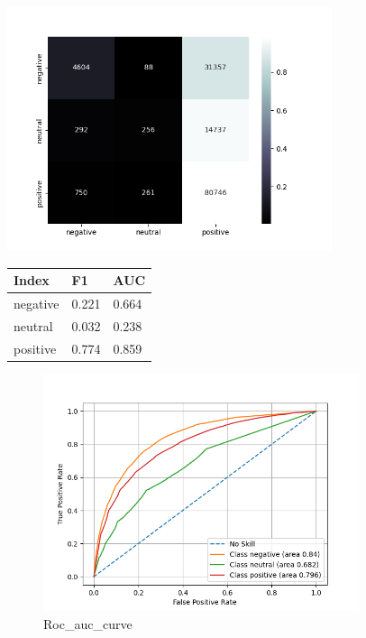 \documentclass{article}%
\begin{document}
{\begin{minipage}[c]{0.95\textwidth}
\begin{minipage}{0.55\textwidth}
\end{minipage}%
\end{minipage}%
\linebreak%
\begin{minipage}{0.7\textwidth}%
\begin{minipage}{0.8\textwidth}%
\includegraphics[width=360px]{./report/Learning/Kneighbors_Classifier/confusion-matrix.png}%
\end{minipage}%
\begin{minipage}{0.5\textwidth}%
\begin{tabu}[t]{X[r] | X[r] X[r]}%
\hline%
\textbf{Index}&\textbf{F1}&\textbf{AUC}\\%
\hline%
negative&0.221&0.664\\%
neutral&0.032&0.238\\%
positive&0.774&0.859\\%
\end{tabu}%
\end{minipage}%
\end{minipage}%


\begin{figure}[h!]%
\centering%
\includegraphics[width=350px]{./report/Learning/Kneighbors_Classifier/True-Positive-Rate.png}%
\caption{Roc\_auc\_curve}%
\end{figure}

}
\end{document}
